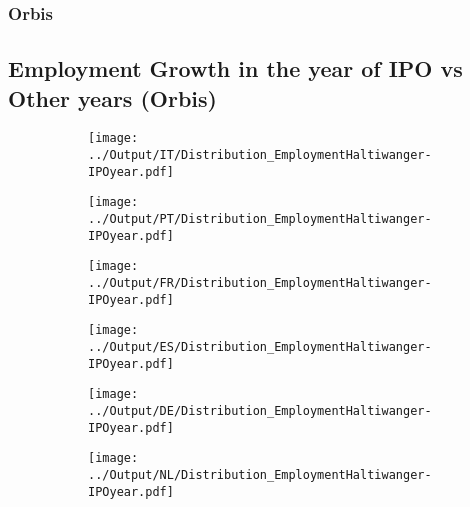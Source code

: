 \documentclass[12pt,notitlepage]{article}
\begin{document}
\subsubsection{Orbis}
\begin{table}[!htpb]
    \centering
\end{table}
\pagebreak




\subsection{Employment Growth in the year of IPO vs Other years (Orbis)}
\begin{figure}[!htpb]
\centering
\begin{subfigure}{.49\textwidth}
    \centering
 \texttt{[image: ../Output/IT/Distribution\_EmploymentHaltiwanger-IPOyear.pdf]}
\end{subfigure}%
\begin{subfigure}{.49\textwidth}
    \centering
 \texttt{[image: ../Output/PT/Distribution\_EmploymentHaltiwanger-IPOyear.pdf]}
\end{subfigure}
\begin{subfigure}{.49\textwidth}
    \centering
 \texttt{[image: ../Output/FR/Distribution\_EmploymentHaltiwanger-IPOyear.pdf]}
\end{subfigure}%
\begin{subfigure}{.49\textwidth}
    \centering
 \texttt{[image: ../Output/ES/Distribution\_EmploymentHaltiwanger-IPOyear.pdf]}
\end{subfigure}
\begin{subfigure}{.49\textwidth}
    \centering
 \texttt{[image: ../Output/DE/Distribution\_EmploymentHaltiwanger-IPOyear.pdf]}
\end{subfigure}
\begin{subfigure}{.49\textwidth}
    \centering
 \texttt{[image: ../Output/NL/Distribution\_EmploymentHaltiwanger-IPOyear.pdf]}
\end{subfigure}
\end{figure}
\pagebreak
\end{document}
